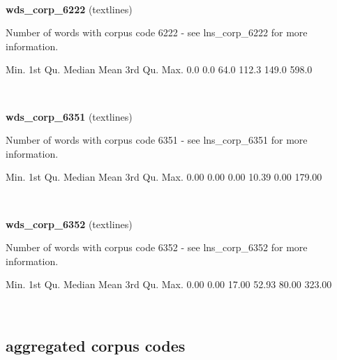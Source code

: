 \documentclass[]{article}
\newenvironment{Shaded}{\begin{snugshade}}{\end{snugshade}}
\newcommand{\FloatTok}[1]{\textcolor[rgb]{0.00,0.00,0.81}{{#1}}}
\newcommand{\NormalTok}[1]{{#1}}
\begin{document}
~

\vspace{1em}

\textbf{wds\_corp\_6222} (textlines)

Number of words with corpus code 6222 - see lns\_corp\_6222 for more
information.

\begin{Shaded}
\begin{Highlighting}[]
   \NormalTok{Min. 1st Qu.  Median    Mean 3rd Qu.    Max. }
    \FloatTok{0.0}     \FloatTok{0.0}    \FloatTok{64.0}   \FloatTok{112.3}   \FloatTok{149.0}   \FloatTok{598.0} 
\end{Highlighting}
\end{Shaded}

~

\vspace{1em}

\textbf{wds\_corp\_6351} (textlines)

Number of words with corpus code 6351 - see lns\_corp\_6351 for more
information.

\begin{Shaded}
\begin{Highlighting}[]
   \NormalTok{Min. 1st Qu.  Median    Mean 3rd Qu.    Max. }
   \FloatTok{0.00}    \FloatTok{0.00}    \FloatTok{0.00}   \FloatTok{10.39}    \FloatTok{0.00}  \FloatTok{179.00} 
\end{Highlighting}
\end{Shaded}

~

\vspace{1em}

\textbf{wds\_corp\_6352} (textlines)

Number of words with corpus code 6352 - see lns\_corp\_6352 for more
information.

\begin{Shaded}
\begin{Highlighting}[]
   \NormalTok{Min. 1st Qu.  Median    Mean 3rd Qu.    Max. }
   \FloatTok{0.00}    \FloatTok{0.00}   \FloatTok{17.00}   \FloatTok{52.93}   \FloatTok{80.00}  \FloatTok{323.00} 
\end{Highlighting}
\end{Shaded}

~

\vspace{1em}

\subsection{aggregated corpus codes}\label{aggregated-corpus-codes}
\end{document}
